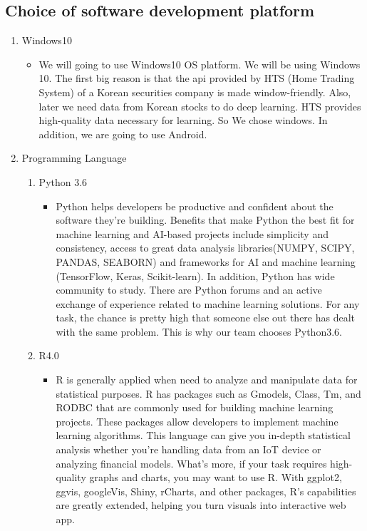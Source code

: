 \documentclass[conference]{IEEEtran}
\begin{document}
\subsection{Choice of software development platform}
\begin{enumerate}
    \item  Windows10 
    \begin{itemize}
    \item We will going to use Windows10 OS platform. We will be using Windows 10. The first big reason is that the api provided by HTS (Home Trading System) of a Korean securities company is made window-friendly. Also, later we need data from Korean stocks to do deep learning. HTS provides high-quality data necessary for learning. So We chose windows. In addition, we are going to use Android.
    \end{itemize}
    \item Programming Language
    \begin{enumerate}
    \item  Python 3.6
        \begin{itemize}
            \item Python helps developers be productive and confident about the software they’re building. Benefits that make Python the best fit for machine learning and AI-based projects include simplicity and consistency, access to great data analysis libraries(NUMPY, SCIPY, PANDAS, SEABORN) and frameworks for AI and machine learning  (TensorFlow, Keras, Scikit-learn). In addition, Python has wide community to study. There are Python forums and an active exchange of experience related to machine learning solutions. For any task, the chance is pretty high that someone else out there has dealt with the same problem. This is why our team chooses Python3.6.
        \end{itemize}
    \item R4.0
        \begin{itemize}
            \item R is generally applied when need to analyze and manipulate data for statistical purposes. R has packages such as Gmodels, Class, Tm, and RODBC that are commonly used for building machine learning projects. These packages allow developers to implement machine learning algorithms. This language can give you in-depth statistical analysis whether you’re handling data from an IoT device or analyzing financial models. What’s more, if your task requires high-quality graphs and charts, you may want to use R. With ggplot2, ggvis, googleVis, Shiny, rCharts, and other packages, R’s capabilities are greatly extended, helping you turn visuals into interactive web app.

\end{itemize}
\end{enumerate}
\end{enumerate}
\end{document}
